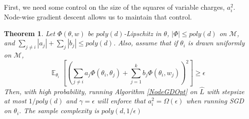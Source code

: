 \documentclass{article}
\newtheorem{theorem}{Theorem}[section]
\DeclareMathOperator*{\expt}{\mathbb{E}}
\begin{document}
First, we need some control on the size of the squares of variable charges, $a_i^2$. Node-wise gradient descent allows us to maintain that control.
%
\begin{theorem}\label{nonDecrease}
  Let $\Phi(\theta, w)$ be $poly(d)$-Lipschitz in $\theta$,
  $|\Phi| \leq poly(d)$ on $\mathcal{M}$, and $\sum_{j \neq i} |a_j| + \sum_j |b_j| \leq poly(d)$. Also, assume that if $\theta_i$ is drawn uniformly on $\mathcal{M}$,
%
\[\expt_{\theta_i}\left[\left(  \sum_{j\neq i} a_j \Phi(\theta_i,\theta_j) + \sum_{j=1}^k b_j \Phi(\theta_i,w_j)\right)^2\right] \geq \epsilon \]
%
Then, with high probability, running Algorithm \ref{NodeGDOpt} on $\widehat{L}$ with stepsize at most $1/poly(d)$ and $\gamma = \epsilon$ will enforce that $a_i^2 = \Omega(\epsilon)$ when running SGD on $\theta_i$. The sample complexity is $poly(d,1/\epsilon)$
\end{theorem}
\end{document}
